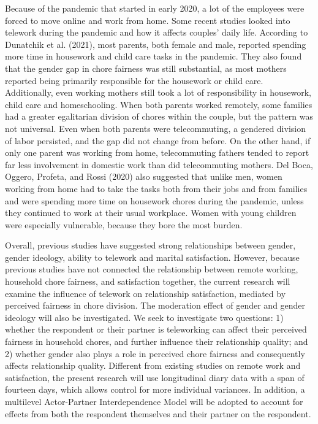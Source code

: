\documentclass[
  english,
  man]{apa6}
\begin{document}
Because of the pandemic that started in early 2020, a lot of the employees were forced to move online and work from home. Some recent studies looked into telework during the pandemic and how it affects couples' daily life. According to Dunatchik et al. (2021), most parents, both female and male, reported spending more time in housework and child care tasks in the pandemic. They also found that the gender gap in chore fairness was still substantial, as most mothers reported being primarily responsible for the housework or child care. Additionally, even working mothers still took a lot of responsibility in housework, child care and homeschooling. When both parents worked remotely, some families had a greater egalitarian division of chores within the couple, but the pattern was not universal. Even when both parents were telecommuting, a gendered division of labor persisted, and the gap did not change from before. On the other hand, if only one parent was working from home, telecommuting fathers tended to report far less involvement in domestic work than did telecommuting mothers. Del Boca, Oggero, Profeta, and Rossi (2020) also suggested that unlike men, women working from home had to take the tasks both from their jobs and from families and were spending more time on housework chores during the pandemic, unless they continued to work at their usual workplace. Women with young children were especially vulnerable, because they bore the most burden.

Overall, previous studies have suggested strong relationships between gender, gender ideology, ability to telework and marital satisfaction. However, because previous studies have not connected the relationship between remote working, household chore fairness, and satisfaction together, the current research will examine the influence of telework on relationship satisfaction, mediated by perceived fairness in chore division. The moderation effect of gender and gender ideology will also be investigated. We seek to investigate two questions: 1) whether the respondent or their partner is teleworking can affect their perceived fairness in household chores, and further influence their relationship quality; and 2) whether gender also plays a role in perceived chore fairness and consequently affects relationship quality. Different from existing studies on remote work and satisfaction, the present research will use longitudinal diary data with a span of fourteen days, which allows control for more individual variances. In addition, a multilevel Actor-Partner Interdependence Model will be adopted to account for effects from both the respondent themselves and their partner on the respondent.
\end{document}

